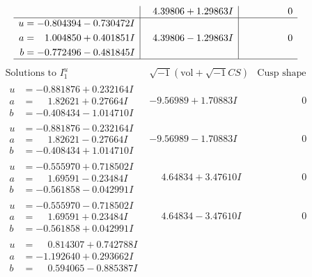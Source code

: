 \documentclass[1p]{elsarticle_modified}
\theoremstyle{definition}
\newcommand{\I}{\sqrt{-1}}
\begin{document}
$$\begin{array}{c|c|c}
 & \phantom{-}4.39806 + 1.29863 I & \phantom{-0.000000 } 0 \\ \hline\begin{aligned}
u &= -0.804394 - 0.730472 I \\
a &= \phantom{-}1.004850 + 0.401851 I \\
b &= -0.772496 - 0.481845 I\end{aligned}
 & \phantom{-}4.39806 - 1.29863 I & \phantom{-0.000000 } 0\\
 \hline 
 \end{array}$$\newpage$$\begin{array}{c|c|c}  
\text{Solutions to }I^u_{1}& \I (\text{vol} + \sqrt{-1}CS) & \text{Cusp shape}\\
 \hline 
\begin{aligned}
u &= -0.881876 + 0.232164 I \\
a &= \phantom{-}1.82621 + 0.27664 I \\
b &= -0.408434 - 1.014710 I\end{aligned}
 & -9.56989 + 1.70883 I & \phantom{-0.000000 } 0 \\ \hline\begin{aligned}
u &= -0.881876 - 0.232164 I \\
a &= \phantom{-}1.82621 - 0.27664 I \\
b &= -0.408434 + 1.014710 I\end{aligned}
 & -9.56989 - 1.70883 I & \phantom{-0.000000 } 0 \\ \hline\begin{aligned}
u &= -0.555970 + 0.718502 I \\
a &= \phantom{-}1.69591 - 0.23484 I \\
b &= -0.561858 - 0.042991 I\end{aligned}
 & \phantom{-}4.64834 + 3.47610 I & \phantom{-0.000000 } 0 \\ \hline\begin{aligned}
u &= -0.555970 - 0.718502 I \\
a &= \phantom{-}1.69591 + 0.23484 I \\
b &= -0.561858 + 0.042991 I\end{aligned}
 & \phantom{-}4.64834 - 3.47610 I & \phantom{-0.000000 } 0 \\ \hline\begin{aligned}
u &= \phantom{-}0.814307 + 0.742788 I \\
a &= -1.192640 + 0.293662 I \\
b &= \phantom{-}0.594065 - 0.885387 I\end{aligned}

\end{array}$$
\end{document}

